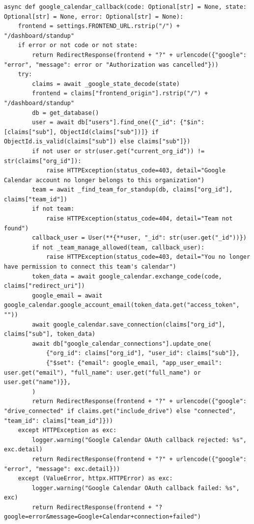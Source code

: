\documentclass[11pt,a4paper]{article}
\begin{document}
{\begin{lstlisting}[style=python]
async def google_calendar_callback(code: Optional[str] = None, state: Optional[str] = None, error: Optional[str] = None):
    frontend = settings.FRONTEND_URL.rstrip("/") + "/dashboard/standup"
    if error or not code or not state:
        return RedirectResponse(frontend + "?" + urlencode({"google": "error", "message": error or "Authorization was cancelled"}))
    try:
        claims = await _google_state_decode(state)
        frontend = claims["frontend_origin"].rstrip("/") + "/dashboard/standup"
        db = get_database()
        user = await db["users"].find_one({"_id": {"$in": [claims["sub"], ObjectId(claims["sub"])]} if ObjectId.is_valid(claims["sub"]) else claims["sub"]})
        if not user or str(user.get("current_org_id")) != str(claims["org_id"]):
            raise HTTPException(status_code=403, detail="Google Calendar account no longer belongs to this organization")
        team = await _find_team_for_standup(db, claims["org_id"], claims["team_id"])
        if not team:
            raise HTTPException(status_code=404, detail="Team not found")
        callback_user = User(**{**user, "_id": str(user.get("_id"))})
        if not _team_manage_allowed(team, callback_user):
            raise HTTPException(status_code=403, detail="You no longer have permission to connect this team's calendar")
        token_data = await google_calendar.exchange_code(code, claims["redirect_uri"])
        google_email = await google_calendar.google_account_email(token_data.get("access_token", ""))
        await google_calendar.save_connection(claims["org_id"], claims["sub"], token_data)
        await db["google_calendar_connections"].update_one(
            {"org_id": claims["org_id"], "user_id": claims["sub"]},
            {"$set": {"email": google_email, "app_user_email": user.get("email"), "full_name": user.get("full_name") or user.get("name")}},
        )
        return RedirectResponse(frontend + "?" + urlencode({"google": "drive_connected" if claims.get("include_drive") else "connected", "team_id": claims["team_id"]}))
    except HTTPException as exc:
        logger.warning("Google Calendar OAuth callback rejected: %s", exc.detail)
        return RedirectResponse(frontend + "?" + urlencode({"google": "error", "message": exc.detail}))
    except (ValueError, httpx.HTTPError) as exc:
        logger.warning("Google Calendar OAuth callback failed: %s", exc)
        return RedirectResponse(frontend + "?google=error&message=Google+Calendar+connection+failed")
\end{lstlisting}

}
\end{document}
